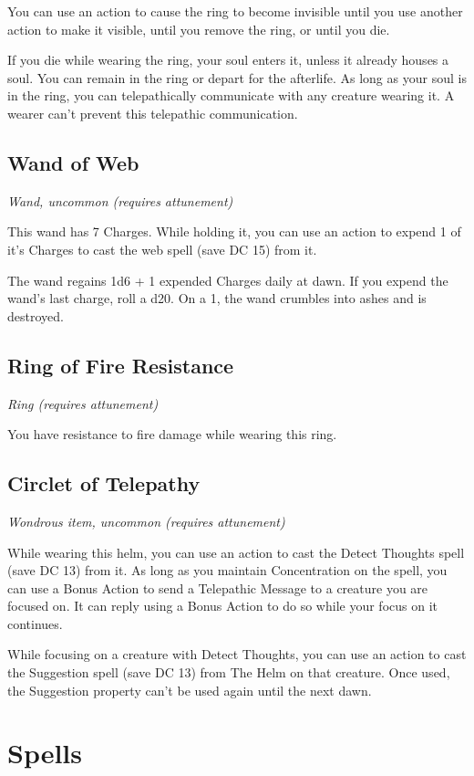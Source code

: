 \documentclass[a4paper,openany,twocolumn]{book}
\begin{document}
You can use an action to cause the ring to become invisible until you use another action to make it visible, until you remove the ring, or until you die.

If you die while wearing the ring, your soul enters it, unless it already houses a soul. You can remain in the ring or depart for the afterlife. As long as your soul is in the ring, you can telepathically communicate with any creature wearing it. A wearer can't prevent this telepathic communication.

\subsection*{Wand of Web}
\textit{Wand, uncommon (requires attunement)}

This wand has 7 Charges. While holding it, you can use an action to expend 1 of it's Charges to cast the web spell (save DC 15) from it.

The wand regains 1d6 + 1 expended Charges daily at dawn. If you expend the wand's last charge, roll a d20. On a 1, the wand crumbles into ashes and is destroyed.


\subsection*{Ring of Fire Resistance}
\textit{Ring (requires attunement)}

You have resistance to fire damage while wearing this ring.

\subsection*{Circlet of Telepathy}
\textit{Wondrous item, uncommon (requires attunement)}

While wearing this helm, you can use an action to cast the Detect Thoughts spell (save DC 13) from it. As long as you maintain Concentration on the spell, you can use a Bonus Action to send a Telepathic Message to a creature you are focused on. It can reply using a Bonus Action to do so while your focus on it continues.

While focusing on a creature with Detect Thoughts, you can use an action to cast the Suggestion spell (save DC 13) from The Helm on that creature. Once used, the Suggestion property can't be used again until the next dawn.

\section*{Spells}
 
\end{document}
